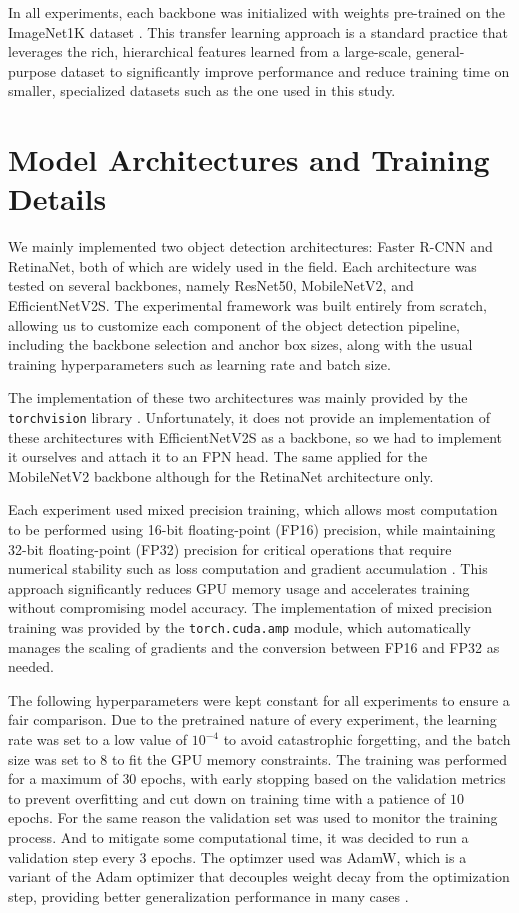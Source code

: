 In all experiments, each backbone was initialized with weights pre-trained on the ImageNet1K dataset \cite{russakovsky2015imagenet}. This transfer learning approach is a standard practice that leverages the rich, hierarchical features learned from a large-scale, general-purpose dataset to significantly improve performance and reduce training time on smaller, specialized datasets such as the one used in this study. 

\section{Model Architectures and Training Details}
We mainly implemented two object detection architectures: Faster R-CNN and RetinaNet, both of which are widely used in the field. Each architecture was tested on several backbones, namely ResNet50, MobileNetV2, and EfficientNetV2S.
The experimental framework was built entirely from scratch, allowing us to customize each component of the object detection pipeline, including the backbone selection and anchor box sizes, along with the usual training hyperparameters such as learning rate and batch size.

The implementation of these two architectures was mainly provided by the \texttt{torchvision} library \cite{torchvision2016} . Unfortunately, it does not provide an implementation of these architectures with EfficientNetV2S as a backbone, so we had to implement it ourselves and attach it to an FPN head. The same applied for the MobileNetV2 backbone although for the RetinaNet architecture only. 

Each experiment used mixed precision training, which allows most computation to be performed using 16-bit floating-point (FP16) precision, while maintaining 32-bit floating-point (FP32) precision for critical operations that require numerical stability such as loss computation and gradient accumulation \cite{micikevicius2018mixedprecisiontraining}.
This approach significantly reduces GPU memory usage and accelerates training without compromising model accuracy. The implementation of mixed precision training was provided by the \texttt{torch.cuda.amp} module, which automatically manages the scaling of gradients and the conversion between FP16 and FP32 as needed. 

The following hyperparameters were kept constant for all experiments to ensure a fair comparison.
Due to the pretrained nature of every experiment, the learning rate was set to a low value of $10^{-4}$ to avoid catastrophic forgetting, and the batch size was set to $8$ to fit the GPU memory constraints. The training was performed for a maximum of $30$ epochs, with early stopping based on the validation metrics to prevent overfitting and cut down on training time with a patience of $10$ epochs. For the same reason the validation set was used to monitor the training process. And to mitigate some computational time, it was decided to run a validation step every $3$ epochs.
The optimzer used was AdamW, which is a variant of the Adam optimizer that decouples weight decay from the optimization step, providing better generalization performance in many cases \cite{loshchilov2019decoupled, kingma2017adam}.

